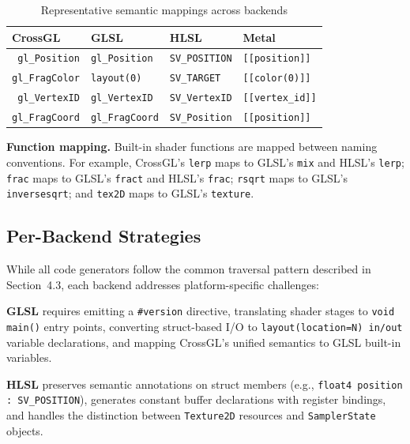 \documentclass{svproc}
\begin{document}
\begin{table}
\caption{Representative semantic mappings across backends}
\label{tab:semanticmap}
\begin{center}
\begin{tabular}{r@{\quad}lll}
\hline
\multicolumn{1}{l}{\rule{0pt}{12pt}\textbf{CrossGL}} & \textbf{GLSL} & \textbf{HLSL} & \textbf{Metal} \\[2pt]
\hline\rule{0pt}{12pt}
\texttt{gl\_Position} & \texttt{gl\_Position} & \texttt{SV\_POSITION} & \texttt{[[position]]} \\
\texttt{gl\_FragColor} & \texttt{layout(0)} & \texttt{SV\_TARGET} & \texttt{[[color(0)]]} \\
\texttt{gl\_VertexID} & \texttt{gl\_VertexID} & \texttt{SV\_VertexID} & \texttt{[[vertex\_id]]} \\
\texttt{gl\_FragCoord} & \texttt{gl\_FragCoord} & \texttt{SV\_Position} & \texttt{[[position]]} \\[2pt]
\hline
\end{tabular}
\end{center}
\end{table}

\textbf{Function mapping.} Built-in shader functions are mapped between naming conventions. For example, CrossGL's \texttt{lerp} maps to GLSL's \texttt{mix} and HLSL's \texttt{lerp}; \texttt{frac} maps to GLSL's \texttt{fract} and HLSL's \texttt{frac}; \texttt{rsqrt} maps to GLSL's \texttt{inversesqrt}; and \texttt{tex2D} maps to GLSL's \texttt{texture}.

\subsection{Per-Backend Strategies}

While all code generators follow the common traversal pattern described in Section~4.3, each backend addresses platform-specific challenges:

\textbf{GLSL} requires emitting a \texttt{\#version} directive, translating shader stages to \texttt{void main()} entry points, converting struct-based I/O to \texttt{layout(location=N) in/out} variable declarations, and mapping CrossGL's unified semantics to GLSL built-in variables.

\textbf{HLSL} preserves semantic annotations on struct members (e.g., \texttt{float4 position : SV\_POSITION}), generates constant buffer declarations with register bindings, and handles the distinction between \texttt{Texture2D} resources and \texttt{SamplerState} objects.
\end{document}

